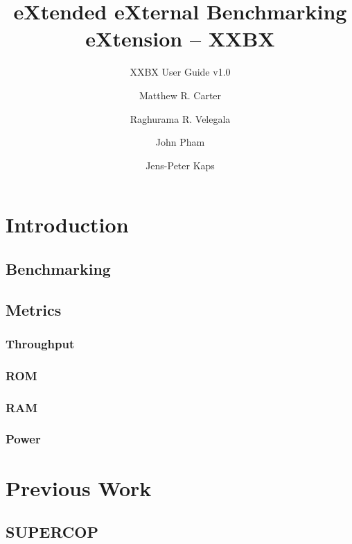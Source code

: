 \documentclass[twoside,11pt]{cergdoc}
\begin{document}
\title{eXtended eXternal Benchmarking eXtension -- XXBX}
\subtitle{XXBX User Guide v1.0}
\author{Matthew R. Carter \and Raghurama R. Velegala \and John Pham \and Jens-Peter Kaps}

\maketitle

\tableofcontents

\chapter{Introduction}
  \section{Benchmarking}
  \section{Metrics}
    \subsection{Throughput}
    \subsection{ROM}
    \subsection{RAM}
    \subsection{Power}
\chapter{Previous Work}
  \section{SUPERCOP}
\end{document}
